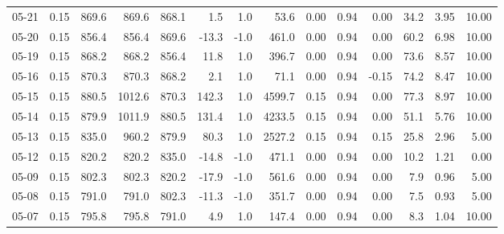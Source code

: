 \begin{threeparttable}
{\begin{tabular}{lrrrrrrrrrrrrr}
  05-21 &     0.15 & 869.6 &  869.6 & 868.1 &        1.5 &                      1.0 &                53.6 &       0.00 &      0.94 &           0.00 &             34.2 &            3.95 &                  10.00 \\
  05-20 &     0.15 & 856.4 &  856.4 & 869.6 &      -13.3 &                     -1.0 &               461.0 &       0.00 &      0.94 &           0.00 &             60.2 &            6.98 &                  10.00 \\
  05-19 &     0.15 & 868.2 &  868.2 & 856.4 &       11.8 &                      1.0 &               396.7 &       0.00 &      0.94 &           0.00 &             73.6 &            8.57 &                  10.00 \\
  05-16 &     0.15 & 870.3 &  870.3 & 868.2 &        2.1 &                      1.0 &                71.1 &       0.00 &      0.94 &          -0.15 &             74.2 &            8.47 &                  10.00 \\
  05-15 &     0.15 & 880.5 & 1012.6 & 870.3 &      142.3 &                      1.0 &              4599.7 &       0.15 &      0.94 &           0.00 &             77.3 &            8.97 &                  10.00 \\
  05-14 &     0.15 & 879.9 & 1011.9 & 880.5 &      131.4 &                      1.0 &              4233.5 &       0.15 &      0.94 &           0.00 &             51.1 &            5.76 &                  10.00 \\
  05-13 &     0.15 & 835.0 &  960.2 & 879.9 &       80.3 &                      1.0 &              2527.2 &       0.15 &      0.94 &           0.15 &             25.8 &            2.96 &                   5.00 \\
  05-12 &     0.15 & 820.2 &  820.2 & 835.0 &      -14.8 &                     -1.0 &               471.1 &       0.00 &      0.94 &           0.00 &             10.2 &            1.21 &                   0.00 \\
  05-09 &     0.15 & 802.3 &  802.3 & 820.2 &      -17.9 &                     -1.0 &               561.6 &       0.00 &      0.94 &           0.00 &              7.9 &            0.96 &                   5.00 \\
  05-08 &     0.15 & 791.0 &  791.0 & 802.3 &      -11.3 &                     -1.0 &               351.7 &       0.00 &      0.94 &           0.00 &              7.5 &            0.93 &                   5.00 \\
  05-07 &     0.15 & 795.8 &  795.8 & 791.0 &        4.9 &                      1.0 &               147.4 &       0.00 &      0.94 &           0.00 &              8.3 &            1.04 &                  10.00 \\

\end{tabular}}
\end{threeparttable}
